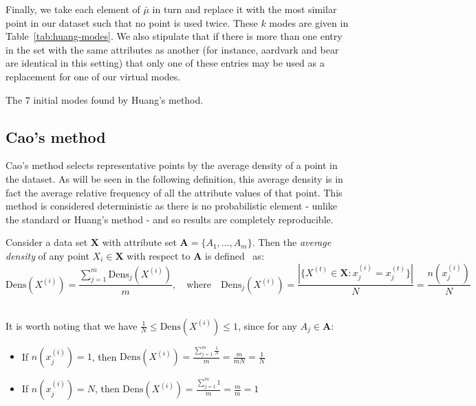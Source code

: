 \begin{example}
    Finally, we take each element of \(\bar{\mu}\) in turn and replace it with
    the most similar point in our dataset such that no point is used twice.
    These \(k\) modes are given in Table~\ref{tab:huang-modes}.
    We also stipulate that if there is more than one entry in the set with the 
    same attributes as another (for instance, aardvark and bear are identical in
    this setting) that only one of these entries may be used as a replacement 
    for one of our virtual modes.\\

    \begin{table}[h]
    \resizebox{\textwidth}{!}{%
        
    }
    \caption{The \(7\) initial modes found by Huang's
    method.}\label{tab:huang-modes}
    \end{table}
\end{example}

\subsection{Cao's method}\label{subsec:cao}

Cao's method selects representative points by the average density of a point in
the dataset. As will be seen in the following definition, this average density 
is in fact the average relative frequency of all the attribute values of that 
point. This method is considered deterministic as there is no probabilistic 
element - unlike the standard or Huang's method - and so results are completely
reproducible.\\

\begin{definition}\label{def:density}	
    Consider a data set \(\textbf{X}\) with attribute set \(\textbf{A} = 
    \{A_1, \ldots, A_m\}\). Then the \emph{average density} of any point 
    \(X_i \in \textbf{X}\) with respect to \(\textbf{A}\) is 
    defined~\cite{Cao09} as:
	\[
	    \text{Dens}(X^{(i)}) = \frac{\sum_{j=1}^m \text{Dens}_{j}(X^{(i)})}{m}, 
        \quad \text{where} \quad \text{Dens}_{j}(X^{(i)}) = \frac{|\{X^{(t)} \in 
        \textbf{X} : x_j^{(i)} = x_j^{(t)}\}|}{N} = \frac{n(x_j^{(i)})}{N}
	\]\\
\end{definition}

\begin{remark}
    It is worth noting that we have \(\frac{1}{N} \leq \text{Dens}(X^{(i)})
    \leq 1\), since for any \(A_j \in \textbf{A}\):		
	\begin{itemize}	
        \item If \(n(x_j^{(i)}) = 1\), then \(\text{Dens}(X^{(i)}) = 
			\frac{\sum_{j=1}^m \frac{1}{N}}{m} = \frac{m}{mN} = \frac{1}{N}\)
        \item If \(n(x_j^{(i)}) = N\), then \(\text{Dens}(X^{(i)}) = 
            \frac{\sum_{j=1}^m 1}{m} = \frac{m}{m} = 1\)\\
	\end{itemize}
\end{remark}

